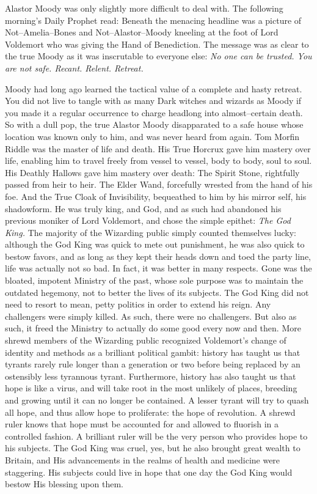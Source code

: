 Alastor Moody was only slightly more difficult to deal with. The following morning’s Daily Prophet read:   Beneath the menacing headline was a picture of Not\mbox{--}Amelia\mbox{--}Bones and Not\mbox{--}Alastor\mbox{--}Moody kneeling at the foot of Lord Voldemort who was giving the Hand of Benediction. The message was as clear to the true Moody as it was inscrutable to everyone else: \emph{No one can be trusted. You are not safe. Recant. Relent. Retreat.}

Moody had long ago learned the tactical value of a complete and hasty retreat. You did not live to tangle with as many Dark witches and wizards as Moody if you made it a regular occurrence to charge headlong into almost\mbox{--}certain death. So with a dull pop, the true Alastor Moody disapparated to a safe house whose location was known only to him, and was never heard from again.
\simpleline
Tom Morfin Riddle was the master of life and death. His True Horcrux gave him mastery over life, enabling him to travel freely from vessel to vessel, body to body, soul to soul. His Deathly Hallows gave him mastery over death: The Spirit Stone, rightfully passed from heir to heir. The Elder Wand, forcefully wrested from the hand of his foe. And the True Cloak of Invisibility, bequeathed to him by his mirror self, his shadowform. He was truly king, and God, and as such had abandoned his previous moniker of Lord Voldemort, and chose the simple epithet: \emph{The God King.}
\SmallVSpace
The majority of the Wizarding public simply counted themselves lucky: although the God King was quick to mete out punishment, he was also quick to bestow favors, and as long as they kept their heads down and toed the party line, life was actually not so bad. In fact, it was better in many respects. Gone was the bloated, impotent Ministry of the past, whose sole purpose was to maintain the outdated hegemony, not to better the lives of its subjects. The God King did not need to resort to mean, petty politics in order to extend his reign. Any challengers were simply killed. As such, there were no challengers. But also as such, it freed the Ministry to actually do some good every now and then.
\SmallVSpace
More shrewd members of the Wizarding public recognized Voldemort’s change of identity and methods as a brilliant political gambit: history has taught us that tyrants rarely rule longer than a generation or two before being replaced by an ostensibly less tyrannous tyrant. Furthermore, history has also taught us that hope is like a virus, and will take root in the most unlikely of places, breeding and growing until it can no longer be contained. A lesser tyrant will try to quash all hope, and thus allow hope to proliferate: the hope of revolution. A shrewd ruler knows that hope must be accounted for and allowed to fluorish in a controlled fashion. A brilliant ruler will be the very person who provides hope to his subjects. The God King was cruel, yes, but he also brought great wealth to Britain, and His advancements in the realms of health and medicine were staggering. His subjects could live in hope that one day the God King would bestow His blessing upon them.
